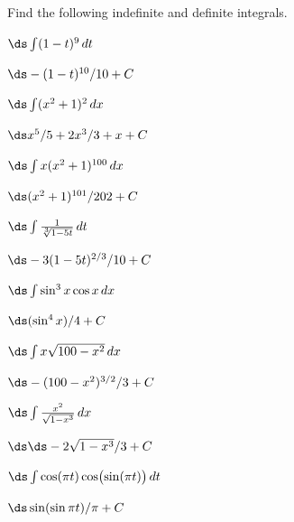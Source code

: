 \begin{enumialphparenastyle}

Find the following indefinite and definite integrals.

\begin{ex}
 $\ds\int (1-t)^9\,dt$
\begin{sol}
 $\ds -(1-t)^{10}/10+C$
\end{sol}
\end{ex}

\begin{ex}
 $\ds\int (x^2+1)^2\,dx$
\begin{sol}
 $\ds x^5/5+2x^3/3+x+C$
\end{sol}
\end{ex}

\begin{ex}
 $\ds\int x(x^2+1)^{100}\,dx$
\begin{sol}
 $\ds (x^2+1)^{101}/202+C$
\end{sol}
\end{ex}

\begin{ex}
 $\ds\int {1\over\root 3 \of {1-5t}}\,dt$ 
\begin{sol}
 $\ds -3(1-5t)^{2/3}/10+C$
\end{sol}
\end{ex}

\begin{ex}
 $\ds\int \sin^3x\cos x\,dx$
\begin{sol}
 $\ds (\sin^4x)/4+C$
\end{sol}
\end{ex}

\begin{ex}
 $\ds\int x\sqrt{100-x^2}\,dx$
\begin{sol}
 $\ds -(100-x^2)^{3/2}/3+C$
\end{sol}
\end{ex}

\begin{ex}
 $\ds\int {x^2\over\sqrt{1-x^3}}\,dx$
\begin{sol}
 $\ds \ds -2\sqrt{1-x^3}/3+C$
\end{sol}
\end{ex}

\begin{ex}
 $\ds\int \cos(\pi t)\cos\bigl(\sin(\pi t)\bigr)\,dt$
\begin{sol}
 $\ds \sin(\sin\pi t)/\pi+C$
\end{sol}
\end{ex}


\end{enumialphparenastyle}
